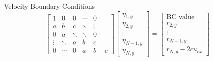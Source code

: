 \documentclass{beamer}
\begin{document}
\begin{frame}[shrink]{Velocity Boundary Conditions}
    $$
        \begin{bmatrix}
            1      & 0      & 0      & \cdots & 0      \\
            a      & b      & c      & \ddots & \vdots \\
            0      & a      & \ddots & \ddots & 0      \\
            \vdots & \ddots & a      & b      & c      \\
            0      & \cdots & 0      & a      & b-c
        \end{bmatrix}
        \begin{bmatrix}
            \eta_{1,y}   \\
            \eta_{2,y}   \\
            \vdots       \\
            \eta_{N-1,y} \\
            \eta_{N,y}
        \end{bmatrix}
        =
        \begin{bmatrix}
            \text{BC value} \\
            r_{2,y}         \\
            \vdots          \\
            r_{N-1,y}       \\
            r_{N,y} - 2 c u_{ex}
        \end{bmatrix}
    $$


\end{frame}
\end{document}
